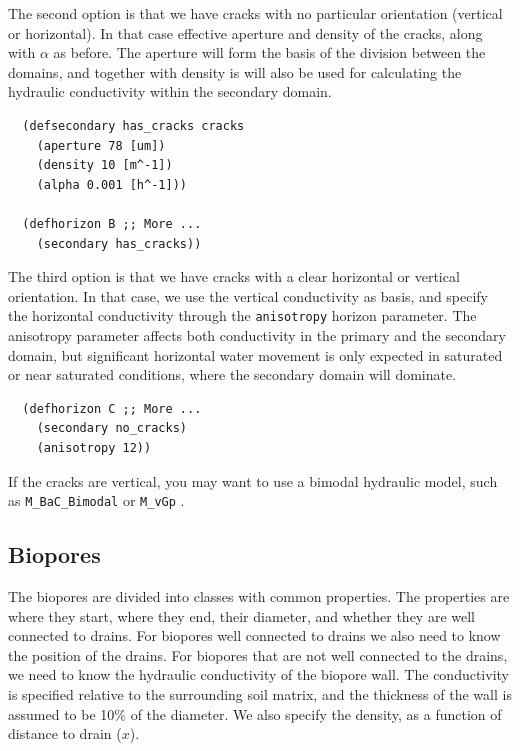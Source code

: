 \documentclass[a4paper]{article}
\begin{document}
The second option is that we have cracks with no particular
orientation (vertical or horizontal).  In that case effective aperture
and density of the cracks, along with $\alpha$ as before.  The
aperture will form the basis of the division between the domains, and
together with density is will also be used for calculating the
hydraulic conductivity within the secondary domain.
\begin{verbatim}
  (defsecondary has_cracks cracks
    (aperture 78 [um])
    (density 10 [m^-1])
    (alpha 0.001 [h^-1]))

  (defhorizon B ;; More ...
    (secondary has_cracks))
\end{verbatim}

The third option is that we have cracks with a clear horizontal or
vertical orientation.  In that case, we use the vertical conductivity
as basis, and specify the horizontal conductivity through the
\verb|anisotropy| horizon parameter.  The anisotropy parameter affects
both conductivity in the primary and the secondary domain, but
significant horizontal water movement is only expected in saturated or
near saturated conditions, where the secondary domain will dominate.
\begin{verbatim}
  (defhorizon C ;; More ...
    (secondary no_cracks)
    (anisotropy 12))
\end{verbatim}
If the cracks are vertical, you may want to use a bimodal hydraulic
model, such as \verb|M_BaC_Bimodal| or \verb|M_vGp| \citep{MvGp}.

\subsection{Biopores}

The biopores are divided into classes with common properties.  The
properties are where they start, where they end, their diameter, and
whether they are well connected to drains.  For biopores well
connected to drains we also need to know the position of the drains.
For biopores that are not well connected to the drains, we need to
know the hydraulic conductivity of the biopore wall.  The conductivity
is specified relative to the surrounding soil matrix, and the
thickness of the wall is assumed to be 10\% of the diameter.  We also
specify the density, as a function of distance to drain ($x$).
\end{document}
